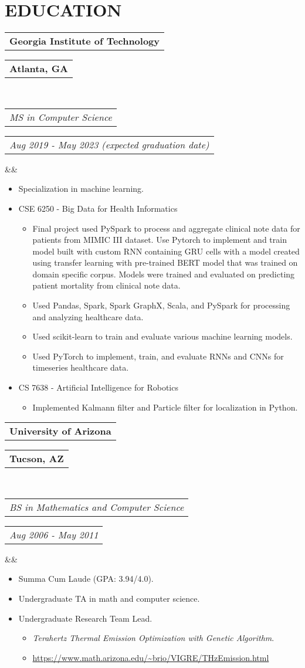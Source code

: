 \documentclass[11pt,a4paper,roman]{moderncv}
\makeatletter
\newcommand*{\customcventry}[7][.25em]{
  \begin{tabular}{@{}l} 
    {\bfseries #4}
  \end{tabular}
  \hfill %
  \begin{tabular}{l@{}}
     {\bfseries #5}
  \end{tabular} \\
  \begin{tabular}{@{}l} 
    {\itshape #3}
  \end{tabular}
  \hfill %
  \begin{tabular}{l@{}}
     {\itshape #2}
  \end{tabular}
  \ifx&#7&%
  \else{\\%
    \begin{minipage}{\maincolumnwidth}%
      \small#7%
    \end{minipage}}\fi%
  \par\addvspace{#1}}
\makeatother
\begin{document}
{{\section{EDUCATION}
{\customcventry{Aug 2019 - May 2023 (expected graduation date)}{MS in Computer Science}{Georgia Institute of Technology}{Atlanta, GA}
{}{}
{
\begin{itemize}
  \item Specialization in machine learning.
  \item CSE 6250 - Big Data for Health Informatics
  \begin{itemize}
  	\item Final project used PySpark to process and aggregate clinical note data for patients from MIMIC III dataset. Use Pytorch to implement and train model built with custom RNN containing GRU cells with a model created using transfer learning with pre-trained BERT model that was trained on domain specific corpus. Models were trained and evaluated on predicting patient mortality from clinical note data.
  	\item Used Pandas, Spark, Spark GraphX, Scala, and PySpark for processing and analyzing healthcare data.
  	\item Used scikit-learn to train and evaluate various machine learning models.
  	\item Used PyTorch to implement, train, and evaluate RNNs and CNNs for timeseries healthcare data.
  \end{itemize}
  \item CS 7638 - Artificial Intelligence for Robotics
  \begin{itemize}
  	\item Implemented Kalmann filter and Particle filter for localization in Python.
  \end{itemize}
 \end{itemize}
}

\vspace{12pt}

{\customcventry{Aug 2006 - May 2011}{BS in Mathematics and Computer Science}{University of Arizona}{Tucson, AZ}{}{}
{\begin{itemize}
  \item Summa Cum Laude (GPA: 3.94/4.0).
  \item Undergraduate TA in math and computer science.
  \item Undergraduate Research Team Lead.
  \begin{itemize}
    \item \textit{Terahertz Thermal Emission Optimization with Genetic Algorithm}.
    \item \url{https://www.math.arizona.edu/~brio/VIGRE/THzEmission.html}
  \end{itemize}
\end{itemize}
}

}}}}
\end{document}

